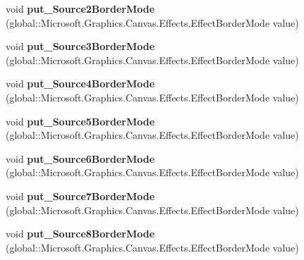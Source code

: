 \begin{DoxyCompactItemize}
void {\bfseries put\+\_\+\+Source2\+Border\+Mode} (global\+::\+Microsoft.\+Graphics.\+Canvas.\+Effects.\+Effect\+Border\+Mode value)
\item 
\mbox{\label{class_microsoft_1_1_graphics_1_1_canvas_1_1_effects_1_1_pixel_shader_effect_ab077a8e15fb0d19c9beda340bc9d0521}} 
void {\bfseries put\+\_\+\+Source3\+Border\+Mode} (global\+::\+Microsoft.\+Graphics.\+Canvas.\+Effects.\+Effect\+Border\+Mode value)
\item 
\mbox{\label{class_microsoft_1_1_graphics_1_1_canvas_1_1_effects_1_1_pixel_shader_effect_a525cc3305f069591bf0c0c6985037643}} 
void {\bfseries put\+\_\+\+Source4\+Border\+Mode} (global\+::\+Microsoft.\+Graphics.\+Canvas.\+Effects.\+Effect\+Border\+Mode value)
\item 
\mbox{\label{class_microsoft_1_1_graphics_1_1_canvas_1_1_effects_1_1_pixel_shader_effect_a3daf23cc5f584ed343976949f836e7c1}} 
void {\bfseries put\+\_\+\+Source5\+Border\+Mode} (global\+::\+Microsoft.\+Graphics.\+Canvas.\+Effects.\+Effect\+Border\+Mode value)
\item 
\mbox{\label{class_microsoft_1_1_graphics_1_1_canvas_1_1_effects_1_1_pixel_shader_effect_ae70dd8ba330ccf9e6f633e30017223df}} 
void {\bfseries put\+\_\+\+Source6\+Border\+Mode} (global\+::\+Microsoft.\+Graphics.\+Canvas.\+Effects.\+Effect\+Border\+Mode value)
\item 
\mbox{\label{class_microsoft_1_1_graphics_1_1_canvas_1_1_effects_1_1_pixel_shader_effect_a4df61c3f37c0f23017cae27697026bce}} 
void {\bfseries put\+\_\+\+Source7\+Border\+Mode} (global\+::\+Microsoft.\+Graphics.\+Canvas.\+Effects.\+Effect\+Border\+Mode value)
\item 
\mbox{\label{class_microsoft_1_1_graphics_1_1_canvas_1_1_effects_1_1_pixel_shader_effect_aa69999f7df82fdafdd87fe4e8dba5297}} 
void {\bfseries put\+\_\+\+Source8\+Border\+Mode} (global\+::\+Microsoft.\+Graphics.\+Canvas.\+Effects.\+Effect\+Border\+Mode value)

\end{DoxyCompactItemize}
